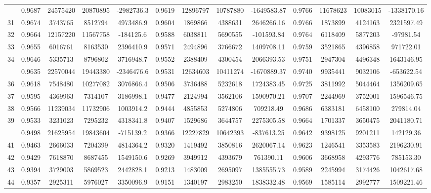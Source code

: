 \documentclass[
  12pt,
]{article}
\begin{document}
\begin{longtable}[t]{lcccccccccccc}
\addlinespace
30 & 0.9687 & 24575420 & 20870895 & -2982736.3 & 0.9619 & 12896797 & 10787880 & -1649583.87 & 0.9766 & 11678623 & 10083015 & -1338170.16\\
31 & 0.9674 & 3743765 & 8512794 & 4973486.9 & 0.9604 & 1869866 & 4388631 & 2646266.16 & 0.9766 & 1873899 & 4124163 & 2321597.49\\
32 & 0.9664 & 12157220 & 11567758 & -184125.6 & 0.9588 & 6038811 & 5690555 & -101593.84 & 0.9764 & 6118409 & 5877203 & -97981.54\\
33 & 0.9655 & 6016761 & 8163530 & 2396410.9 & 0.9571 & 2494896 & 3766672 & 1409708.11 & 0.9759 & 3521865 & 4396858 & 971722.01\\
34 & 0.9646 & 5335713 & 8796802 & 3716948.7 & 0.9552 & 2388409 & 4300454 & 2066393.53 & 0.9751 & 2947304 & 4496348 & 1643146.95\\
\addlinespace
35 & 0.9635 & 22570044 & 19443380 & -2346476.6 & 0.9531 & 12634603 & 10411274 & -1670889.37 & 0.9740 & 9935441 & 9032106 & -653622.54\\
36 & 0.9618 & 7548480 & 10277082 & 3076866.4 & 0.9506 & 3736488 & 5232618 & 1724383.45 & 0.9725 & 3811992 & 5044464 & 1356209.65\\
37 & 0.9595 & 4369963 & 7314107 & 3186998.1 & 0.9477 & 2124994 & 3562106 & 1590970.21 & 0.9707 & 2244969 & 3752001 & 1596546.75\\
38 & 0.9566 & 11239034 & 11732906 & 1003914.2 & 0.9444 & 4855853 & 5274806 & 709218.49 & 0.9686 & 6383181 & 6458100 & 279814.04\\
39 & 0.9533 & 3231023 & 7295232 & 4318341.8 & 0.9407 & 1529686 & 3644757 & 2275305.58 & 0.9664 & 1701337 & 3650475 & 2041180.71\\
\addlinespace
40 & 0.9498 & 21625954 & 19843604 & -715139.2 & 0.9366 & 12227829 & 10642393 & -837613.25 & 0.9642 & 9398125 & 9201211 & 142129.36\\
41 & 0.9463 & 2666033 & 7204399 & 4814364.2 & 0.9320 & 1419492 & 3850816 & 2620067.14 & 0.9623 & 1246541 & 3353583 & 2196230.91\\
42 & 0.9429 & 7618870 & 8687455 & 1549150.6 & 0.9269 & 3949912 & 4393679 & 761390.11 & 0.9606 & 3668958 & 4293776 & 785153.30\\
43 & 0.9394 & 3729003 & 5869523 & 2442828.1 & 0.9213 & 1483009 & 2695097 & 1385555.73 & 0.9589 & 2245994 & 3174426 & 1042617.68\\
44 & 0.9357 & 2925311 & 5976027 & 3350096.9 & 0.9151 & 1340197 & 2983250 & 1838332.48 & 0.9569 & 1585114 & 2992777 & 1509221.46\\

\end{longtable}
\end{document}
